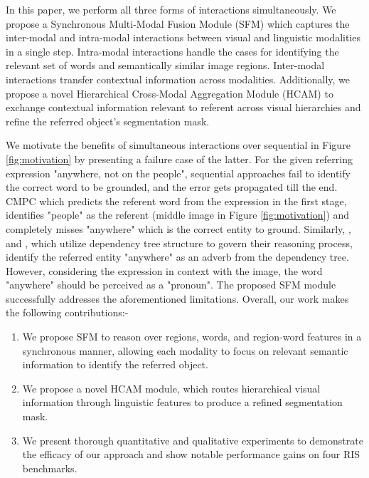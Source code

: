 \documentclass[11pt]{article}
\begin{document}
In this paper, we perform all three forms of interactions simultaneously. We propose a Synchronous Multi-Modal Fusion Module (SFM) which captures the inter-modal and intra-modal interactions between visual and linguistic modalities in a single step. Intra-modal interactions handle the cases for identifying the relevant set of words and semantically similar image regions. Inter-modal interactions transfer contextual information across modalities. Additionally, we propose a novel Hierarchical Cross-Modal Aggregation Module (HCAM) to exchange contextual information relevant to referent across visual hierarchies and refine the referred object's segmentation mask.









We motivate the benefits of simultaneous interactions over sequential in Figure \ref{fig:motivation} by presenting a failure case of the latter. For the given referring expression "anywhere, not on the people", sequential approaches fail to identify the correct word to be grounded, and the error gets propagated till the end. CMPC \cite{Huang_2020_CVPR} which predicts the referent word from the expression in the first stage, identifies "people" as the referent (middle image in Figure \ref{fig:motivation}) and completely misses "anywhere" which is the correct entity to ground. Similarly, \cite{Yang_2021_CVPR}, and \cite{hui2020linguistic}, which utilize dependency tree structure to govern their reasoning process, identify the referred entity "anywhere" as an adverb from the dependency tree. However, considering the expression in context with the image, the word "anywhere" should be perceived as a "pronoun". The proposed SFM module successfully addresses the aforementioned limitations. Overall, our work makes the following contributions:- 
\begin{enumerate} \item We propose SFM to reason over regions, words, and region-word features in a synchronous manner, allowing each modality to focus on relevant semantic information to identify the referred object. \vspace{-0.8em}
\item We propose a novel HCAM module, which routes hierarchical visual information through linguistic features to produce a refined segmentation mask. \vspace{-0.8em}
    \item We present thorough quantitative and qualitative experiments to demonstrate the efficacy of our approach and show notable performance gains on four RIS benchmarks. 
\end{enumerate}
\end{document}
